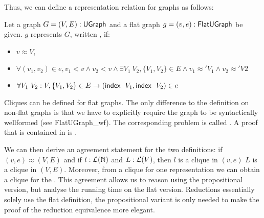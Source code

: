 Thus, we can define a representation relation for graphs as follows: 
\begin{definition}\label{def:graph_repr}
  Let a graph $G = (V, E) : \textsf{UGraph}$ and a flat graph $g = (v, e) : \textsf{FlatUGraph}$ be given. 
  $g$ represents $G$, written , if: 
  \begin{itemize}
    \item $v \approx V$, 
    \item $\forall (v_1, v_2) \in e, v_1 < v \land v_2 < v \land \exists V_1~V_2, \{V_1, V_2\} \in E \land v_1 \approx' V_1 \land v_2 \approx' V2$
    \item $\forall V_1~V_2 : V, \{V_1, V_2\} \in E \rightarrow (\textsf{index}~~V_1, \textsf{index}~~V_2) \in e$
  \end{itemize}
\end{definition}

Cliques can be defined  for flat graphs. 
The only difference to the definition on non-flat graphs is that we have to explicitly require the graph to be syntactically wellformed (see \textsf{FlatUGraph\_wf}). 
The corresponding problem is called \mnotec[FlatClique]{\FlatClique{}}. A proof that \FlatClique{} is contained in \NP{} is .

We can then derive an agreement statement for the two definitions: if $(v, e) \approx (V, E)$ and if $l : \mathcal{L} (\mathbb{N})$ and $L : \mathcal{L} (V)$, then $l$ is a clique in $(v, e)$  $L$ is a clique in $(V, E)$. Moreover, from a clique for one representation we can obtain a clique for the  .
This agreement allows us to reason using the propositional version, but analyse the running time on the flat version. Reductions essentially solely use the flat definition, the propositional variant is only needed to make the proof of the reduction equivalence more elegant.

